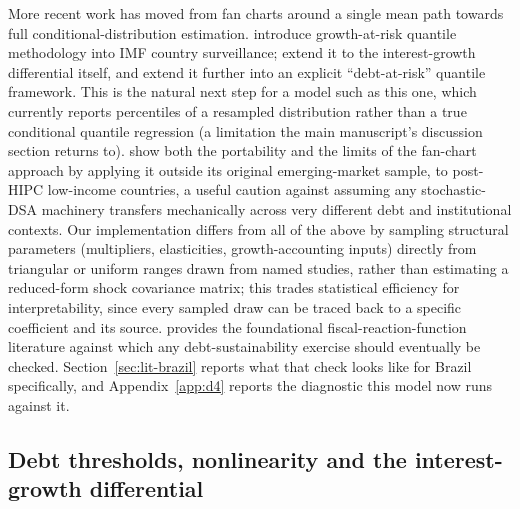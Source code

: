 \documentclass[11pt,a4paper]{article}
\begin{document}
More recent work has moved from fan charts around a single mean path towards full conditional-distribution estimation. \citet{prasadetal2019growthatrisk} introduce growth-at-risk quantile methodology into IMF country surveillance; \citet{lianpresbiterowiriadinata2020} extend it to the interest-growth differential itself, and \citet{furcerietal2025debtrisk} extend it further into an explicit ``debt-at-risk'' quantile framework. This is the natural next step for a model such as this one, which currently reports percentiles of a resampled distribution rather than a true conditional quantile regression (a limitation the main manuscript's discussion section returns to). \citet{kaffomelouetal2014} show both the portability and the limits of the fan-chart approach by applying it outside its original emerging-market sample, to post-HIPC low-income countries, a useful caution against assuming any stochastic-DSA machinery transfers mechanically across very different debt and institutional contexts. Our implementation differs from all of the above by sampling structural parameters (multipliers, elasticities, growth-accounting inputs) directly from triangular or uniform ranges drawn from named studies, rather than estimating a reduced-form shock covariance matrix; this trades statistical efficiency for interpretability, since every sampled draw can be traced back to a specific coefficient and its source. \citet{bohn1998} provides the foundational fiscal-reaction-function literature against which any debt-sustainability exercise should eventually be checked. Section~\ref{sec:lit-brazil} reports what that check looks like for Brazil specifically, and Appendix~\ref{app:d4} reports the diagnostic this model now runs against it.

\subsection{Debt thresholds, nonlinearity and the interest-growth differential}
\label{sec:lit-threshold}
\end{document}
